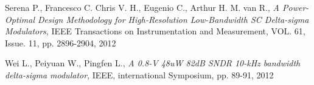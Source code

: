 \begin{thebibliography}{9}
Serena P., Francesco C. Chris V. H., Eugenio C., Arthur H. M. van R., 
\textit{A Power-Optimal Design Methodology for High-Resolution Low-Bandwidth SC Delta-sigma Modulators},
IEEE Transactions on Instrumentation and Measurement, VOL. 61, Issue. 11, pp. 2896-2904, 2012

Wei L., Peiyuan W., Pingfen L.,
\textit{A 0.8-V 48uW 82dB SNDR 10-kHz bandwidth delta-sigma modulator},
IEEE, international Symposium, pp. 89-91, 2012
\end{thebibliography}

